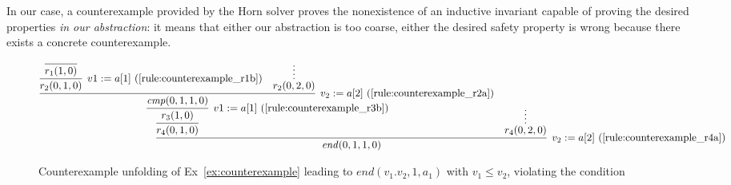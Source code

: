 \documentclass[a4paper]{article}
\theoremstyle{definition}
\theoremstyle{plain}
\begin{document}
In our case, a counterexample provided by the Horn solver proves the nonexistence of an inductive invariant capable of proving the desired properties \emph{in our abstraction}: it means that either our abstraction is too coarse, either the desired safety property is wrong because there exists a concrete counterexample.

\begin{figure}
{\small $
\infer[{v_2:=a[2]} \text{~(\ref{rule:counterexample_r4a})}]{\mathit{end}(0,1,1,0)}{
  \infer{r_4(0,1,0)}{
    \infer[{v1:=a[1]} \text{~(\ref{rule:counterexample_r3b})}]{r_3(1,0)}{
      \infer[{v_2:=a[2]} \text{~(\ref{rule:counterexample_r2a})}]{\mathit{cmp}(0,1,1,0)}{
        \infer[{v1:=a[1]} \text{~(\ref{rule:counterexample_r1b})}]{r_2(0,1,0)}{
          \infer{r_1(1,0)}{}
        } &
        \infer*{r_2(0,2,0)}{}
      }
    }
  } &
  \infer*{r_4(0,2,0)}{}
}
$
}
\caption{Counterexample unfolding of Ex~\ref{ex:counterexample} leading to $\mathit{end}(v_1.v_2,1,a_1)$ with $v_1 \leq v_2$, violating the condition}
\label{fig:counterexample_unfolding}
\end{figure}
\end{document}

